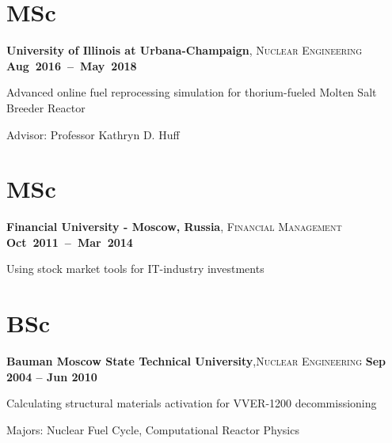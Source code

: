 \documentclass[margin,line]{resume}
\begin{document}
\begin{resume}
    \section{\mysidestyle MSc}
    \textbf{University of Illinois at Urbana-Champaign}, \textsc{Nuclear Engineering} \hfill\textbf{\mbox{Aug 2016 -- May 2018}}\vspace{-3mm}\\\vspace{-1mm}%
    \begin{list2}
        \item Advanced online fuel reprocessing simulation for thorium-fueled Molten Salt Breeder Reactor
        \item Advisor:  Professor Kathryn D. Huff
    \end{list2}\vspace{-1.5mm}
    \section{\mysidestyle MSc}
    \textbf{Financial University - Moscow, Russia}, \textsc{Financial Management} \hfill \textbf{\mbox{Oct 2011 -- Mar 2014	}}\vspace{-3mm}\\\vspace{-1mm}%
    \begin{list2}
        \item Using stock market tools for IT-industry investments
    \end{list2}\vspace{-1.5mm}
    \section{\mysidestyle BSc}
    \textbf{Bauman Moscow State Technical University},\textsc{Nuclear Engineering}\hfill \textbf{ Sep 2004 -- Jun 2010}\vspace{-3mm}\\\vspace{-1mm}%
    \begin{list2}
	\item Calculating structural materials activation for VVER-1200 decommissioning
	\item Majors: Nuclear Fuel Cycle, Computational Reactor Physics
    \end{list2}\vspace{-1.5mm}


\end{resume}
\end{document}
